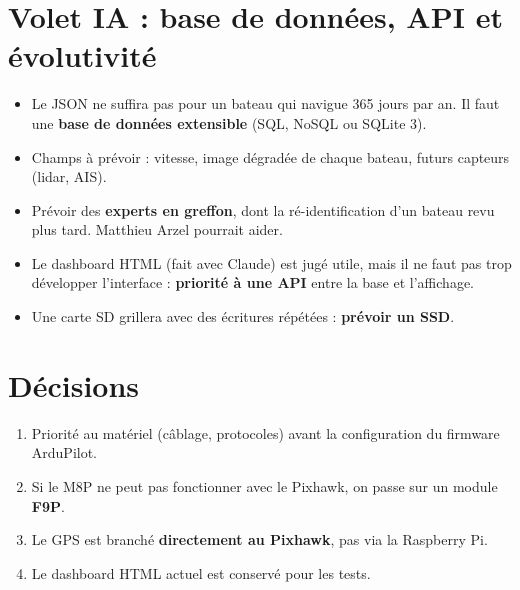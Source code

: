 \documentclass[10pt,a4paper]{article}
\begin{document}
\section{Volet IA : base de données, API et évolutivité}
\begin{itemize}
  \item Le JSON ne suffira pas pour un bateau qui navigue 365 jours par an. Il faut une \textbf{base de données extensible} (SQL, NoSQL ou SQLite 3).
  \item Champs à prévoir : vitesse, image dégradée de chaque bateau, futurs capteurs (lidar, AIS).
  \item Prévoir des \textbf{experts en greffon}, dont la ré-identification d'un bateau revu plus tard. Matthieu Arzel pourrait aider.
  \item Le dashboard HTML (fait avec Claude) est jugé utile, mais il ne faut pas trop développer l'interface : \textbf{priorité à une API} entre la base et l'affichage.
  \item Une carte SD grillera avec des écritures répétées : \textbf{prévoir un SSD}.
\end{itemize}

\section{Décisions}
\begin{enumerate}[label={\color{cExp}\bfseries\arabic*.}]
  \item Priorité au matériel (câblage, protocoles) avant la configuration du firmware ArduPilot.
  \item Si le M8P ne peut pas fonctionner avec le Pixhawk, on passe sur un module \textbf{F9P}.
  \item Le GPS est branché \textbf{directement au Pixhawk}, pas via la Raspberry Pi.
  \item Le dashboard HTML actuel est conservé pour les tests.
\end{enumerate}
\end{document}
